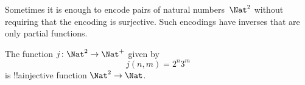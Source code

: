 \documentclass[../../../include/open-logic-section]{subfiles}
\begin{document}
Sometimes it is enough to encode pairs of natural numbers~$\Nat^2$
without requiring that the encoding is surjective. Such encodings have
inverses that are only partial functions. 

\begin{ex}
The function $j\colon \Nat^2 \to \Nat^+$ given by
\[
j(n,m) = 2^n3^m
\]
is !!a{injective} function $\Nat^2 \to \Nat$.
\end{ex}
\end{document}
